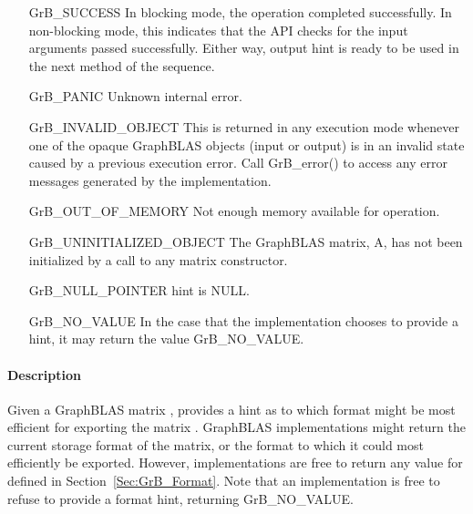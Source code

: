 \begin{itemize}[leftmargin=2.3in]
    \item[{\sf GrB\_SUCCESS}]         In blocking mode, the operation completed
    successfully. In non-blocking mode, this indicates that the API checks 
    for the input arguments passed successfully. Either way, output
    {\sf hint} is ready to be used in the next method of the sequence.

    \item[{\sf GrB\_PANIC}]           Unknown internal error.
    
    \item[{\sf GrB\_INVALID\_OBJECT}] This is returned in any execution mode 
    whenever one of the opaque GraphBLAS objects (input or output) is in an invalid 
    state caused by a previous execution error.  Call {\sf GrB\_error()} to access 
    any error messages generated by the implementation.

    \item[{\sf GrB\_OUT\_OF\_MEMORY}] Not enough memory available for operation.
    
    \item[{\sf GrB\_UNINITIALIZED\_OBJECT}]  The GraphBLAS matrix, {\sf A}, has 
    not been initialized by a call to any matrix constructor.
    
    \item[{\sf GrB\_NULL\_POINTER}]  {\sf hint} is {\sf NULL}.

    \item[{\sf GrB\_NO\_VALUE}]  In the case that the implementation chooses to
    provide a hint, it may return the value {\sf GrB\_NO\_VALUE}.
\end{itemize}

\paragraph{Description}

Given a GraphBLAS matrix , provides a hint as to which format might be most
efficient for exporting the matrix .  GraphBLAS implementations might
return the current storage format of the matrix, or the format to which it could
most efficiently be exported.  However, implementations are free to return any
value for  defined in Section~\ref{Sec:GrB_Format}.  Note that an
implementation is free to refuse to provide a format hint, returning
{\sf GrB\_NO\_VALUE}.


